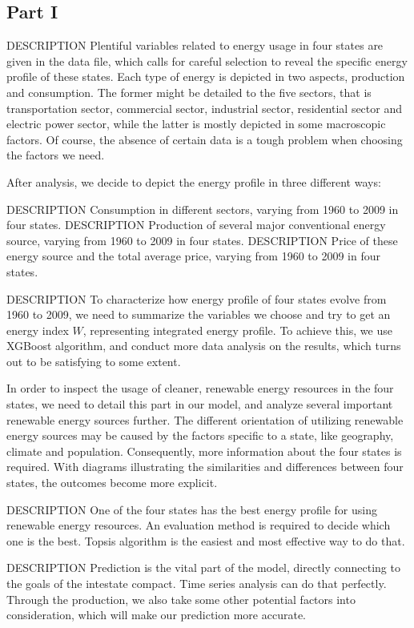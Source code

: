 \documentclass{mcmthesis}
\makeatletter
\newcommand{\DESCRIPTION@original@item}{}
\let\DESCRIPTION@original@item\item
\newcommand*{\DESCRIPTION@envir}{DESCRIPTION}
\newlength{\DESCRIPTION@totalleftmargin}
\newlength{\DESCRIPTION@linewidth}
\newcommand{\DESCRIPTION@makelabel}[1]{\llap{#1}}%
\newcommand{\DESCRIPTION@item}[1][]{%
  \setlength{\@totalleftmargin}%
       {\DESCRIPTION@totalleftmargin+\widthof{\textbf{#1 }}-\leftmargin}%
  \setlength{\linewidth}
       {\DESCRIPTION@linewidth-\widthof{\textbf{#1 }}+\leftmargin}%
  \par\parshape \@ne \@totalleftmargin \linewidth
  \DESCRIPTION@original@item[\textbf{#1}]%
}
\newenvironment{DESCRIPTION}
  {\list{}{\setlength{\labelwidth}{0cm}%
           \let\makelabel\DESCRIPTION@makelabel}%
   \setlength{\DESCRIPTION@totalleftmargin}{\@totalleftmargin}%
   \setlength{\DESCRIPTION@linewidth}{\linewidth}%
   \renewcommand{\item}{\ifx\@currenvir\DESCRIPTION@envir
                           \expandafter\DESCRIPTION@item
                        \else
                           \expandafter\DESCRIPTION@original@item
                        \fi}}
  {\endlist}
\makeatother
\begin{document}
\subsection{Part I}
\begin{DESCRIPTION}
\item [A] Plentiful variables related to energy usage in four states are given in the data file, which calls for careful selection to reveal the specific energy profile of these states.
Each type of energy is depicted in two aspects, production and consumption.
The former might be detailed to the five sectors, that is transportation sector, commercial sector, industrial sector, residential sector and electric power sector, while the latter is mostly depicted in some macroscopic factors.
Of course, the absence of certain data is a tough problem when choosing the factors we need.

After analysis, we decide to depict the energy profile in three different ways:
\begin{itemize}  
\item Consumption in different sectors, varying from 1960 to 2009 in four states.
\item Production of several major conventional energy source, varying from 1960 to 2009 in four states. 
\item Price of these energy source and the total average price, varying from 1960 to 2009 in four states.
\end{itemize}

\item [B] To characterize how energy profile of four states evolve from 1960 to 2009, we need to summarize the variables we choose and try to get an energy index $W$, representing integrated energy profile.
To achieve this, we use XGBoost algorithm, and conduct more data analysis on the results, which turns out to be satisfying to some extent.

In order to inspect the usage of cleaner, renewable energy resources in the four states, we need to detail this part in our model, and analyze several important renewable energy sources further.
The different orientation of utilizing renewable energy sources may be caused by the factors specific to a state, like geography, climate and population.
Consequently, more information about the four states is required.
With diagrams illustrating the similarities and differences between four states, the outcomes become more explicit.

\item [C] One of the four states has the best energy profile for using renewable energy resources.
An evaluation method is required to decide which one is the best.
Topsis algorithm is the easiest and most effective way to do that.

\item [D] Prediction is the vital part of the model, directly connecting to the goals of the intestate compact.
Time series analysis can do that perfectly. 
Through the production, we also take some other potential factors into consideration, which will make our prediction more accurate.
\end{DESCRIPTION}
\end{document}
